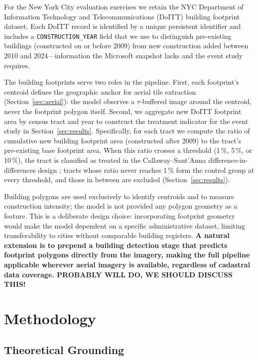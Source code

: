 \documentclass[conference]{IEEEtran}
\begin{document}
For the New York City evaluation exercises we retain the NYC Department of Information Technology and Telecommunications (DoITT) building footprint dataset. Each DoITT record is identified by a unique persistent identifier and includes a \texttt{CONSTRUCTION\_YEAR} field that we use to distinguish pre-existing buildings (constructed on or before 2009) from new construction added between 2010 and 2024—information the Microsoft snapshot lacks and the event study requires.

The building footprints serve two roles in the pipeline. First, each footprint's centroid defines the geographic anchor for aerial tile extraction (Section~\ref{sec:aerial}): the model observes a $\tau$-buffered image around the centroid, never the footprint polygon itself. Second, we aggregate new DoITT footprint area by census tract and year to construct the treatment indicator for the event study in Section~\ref{sec:results}. Specifically, for each tract we compute the ratio of cumulative new building footprint area (constructed after 2009) to the tract's pre-existing base footprint area. When this ratio crosses a threshold (1\,\%, 5\,\%, or 10\,\%), the tract is classified as treated in the Callaway--Sant'Anna difference-in-differences design \citep{csa}; tracts whose ratio never reaches 1\,\% form the control group at every threshold, and those in between are excluded (Section~\ref{sec:results}).

Building polygons are used exclusively to identify centroids and to measure construction intensity; the model is not provided any polygon geometry as a feature. This is a deliberate design choice: incorporating footprint geometry would make the model dependent on a specific administrative dataset, limiting transferability to cities without comparable building registers. \textbf{A natural extension is to prepend a building detection stage that predicts footprint polygons directly from the imagery, making the full pipeline applicable wherever aerial imagery is available, regardless of cadastral data coverage. PROBABLY WILL DO, WE SHOULD DISCUSS THIS!}

\section{Methodology}\label{sec:methodology}

\subsection{Theoretical Grounding}
\end{document}

